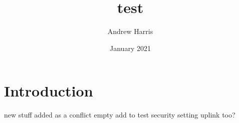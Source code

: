 \documentclass{article}
\title{test}
\author{Andrew Harris}
\date{January 2021}
\begin{document}
\maketitle

\section{Introduction}
new stuff added as a conflict
empty
add to test security setting
uplink too?
\end{document}
